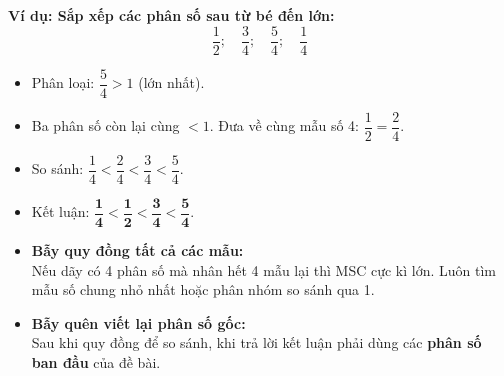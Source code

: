 \documentclass[14pt,a4paper,oneside]{extbook}
\begin{document}
\vspace{-2.5mm}
\noindent
\begin{minipage}[t]{0.49\textwidth}\vspace{0pt}
\begin{tcolorbox}[
  enhanced,
  colback=green!4!white,
  colframe=green!60!black,
  arc=2mm, boxrule=0.8pt,
  left=2mm, right=2mm, top=1.8mm, bottom=1.8mm,
  title={\footnotesize\bfseries\color{white}\faCheckCircle\ Ví dụ thực hành chuẩn mực}
]
{\footnotesize
\textbf{Ví dụ: Sắp xếp các phân số sau từ bé đến lớn:}\\
$$\dfrac{1}{2}; \quad \dfrac{3}{4}; \quad \dfrac{5}{4}; \quad \dfrac{1}{4}$$
\begin{itemize}\setlength{\itemsep}{1pt}\setlength{\leftskip}{-2.5mm}
  \item Phân loại: $\dfrac{5}{4} > 1$ (lớn nhất).
  \item Ba phân số còn lại cùng $< 1$. Đưa về cùng mẫu số 4: $\dfrac{1}{2} = \dfrac{2}{4}$.
  \item So sánh: $\dfrac{1}{4} < \dfrac{2}{4} < \dfrac{3}{4} < \dfrac{5}{4}$.
  \item Kết luận: $\mathbf{\dfrac{1}{4} < \dfrac{1}{2} < \dfrac{3}{4} < \dfrac{5}{4}}$.
\end{itemize}
}
\end{tcolorbox}
\end{minipage}
\hfill
\begin{minipage}[t]{0.49\textwidth}\vspace{0pt}
\begin{tcolorbox}[
  enhanced,
  colback=red!4!white,
  colframe=red!70!black,
  arc=2mm, boxrule=0.8pt,
  left=2mm, right=2mm, top=1.8mm, bottom=1.8mm,
  title={\footnotesize\bfseries\color{white}\faExclamationTriangle\ Mẹo tránh bẫy trắc nghiệm}
]
{\footnotesize
\begin{itemize}\setlength{\itemsep}{1.5pt}\setlength{\leftskip}{-2.5mm}
  \item \textbf{Bẫy quy đồng tất cả các mẫu:}\\
  Nếu dãy có 4 phân số mà nhân hết 4 mẫu lại thì MSC cực kì lớn. Luôn tìm mẫu số chung nhỏ nhất hoặc phân nhóm so sánh qua 1.
  \item \textbf{Bẫy quên viết lại phân số gốc:}\\
  Sau khi quy đồng để so sánh, khi trả lời kết luận phải dùng các \textbf{phân số ban đầu} của đề bài.
\end{itemize}
}
\end{tcolorbox}
\end{minipage}
\end{document}
